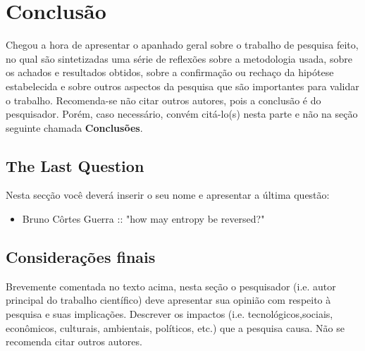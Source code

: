 \chapter{Conclusão}
\label{chap:conc}

Chegou a hora de apresentar o apanhado geral sobre o trabalho de
pesquisa feito, no qual s\~ao sintetizadas uma s\'erie de
reflex\~oes sobre a metodologia usada, sobre os achados e
resultados obtidos, sobre a confirma\c{c}\~ao ou recha\c{c}o da
hip\'otese estabelecida e sobre outros aspectos da pesquisa que
s\~ao importantes para validar o trabalho. Recomenda-se n\~ao
citar outros autores, pois a conclus\~ao \'e do pesquisador.
Por\'em, caso necess\'ario, conv\'em cit\'a-lo(s) nesta parte e
n\~ao na se\c{c}\~ao seguinte chamada \textbf{Conclus\~oes}.

\section{The Last Question}
Nesta secção você deverá inserir o seu nome e apresentar a última questão:

\begin{itemize}
    \item Bruno Côrtes Guerra :: "how may entropy be reversed?"
\end{itemize}


\section{Considerações finais}
\label{sec:consid}

Brevemente comentada no texto acima, nesta se\c{c}\~ao o
pesquisador (i.e. autor principal do trabalho cient\'ifico) deve
apresentar sua opini\~ao com respeito \`a pesquisa e suas
implica\c{c}\~oes. Descrever os impactos (i.e.
tecnol\'ogicos,sociais, econ\^omicos, culturais, ambientais,
políticos, etc.) que a pesquisa causa. N\~ao se recomenda citar
outros autores.

